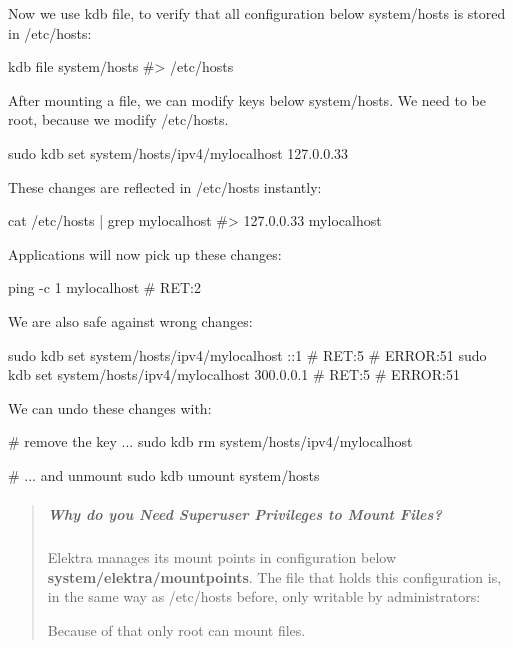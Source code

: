 Now we use {\ttfamily kdb file}, to verify that all configuration below {\ttfamily system/hosts} is stored in {\ttfamily /etc/hosts}\+:


\begin{DoxyCode}
kdb file system/hosts
#> /etc/hosts
\end{DoxyCode}


After mounting a file, we can modify keys below {\ttfamily system/hosts}. We need to be root, because we modify {\ttfamily /etc/hosts}.


\begin{DoxyCode}
sudo kdb set system/hosts/ipv4/mylocalhost 127.0.0.33
\end{DoxyCode}


These changes are reflected in {\ttfamily /etc/hosts} instantly\+:


\begin{DoxyCode}
cat /etc/hosts | grep mylocalhost
#> 127.0.0.33   mylocalhost
\end{DoxyCode}


Applications will now pick up these changes\+:


\begin{DoxyCode}
ping -c 1 mylocalhost
# RET:2
\end{DoxyCode}


We are also safe against wrong changes\+:


\begin{DoxyCode}
sudo kdb set system/hosts/ipv4/mylocalhost ::1
# RET:5
# ERROR:51
sudo kdb set system/hosts/ipv4/mylocalhost 300.0.0.1
# RET:5
# ERROR:51
\end{DoxyCode}


We can undo these changes with\+:


\begin{DoxyCode}
# remove the key ...
sudo kdb rm system/hosts/ipv4/mylocalhost

# ... and unmount
sudo kdb umount system/hosts
\end{DoxyCode}


\begin{quote}
\subparagraph*{Why do you Need Superuser Privileges to Mount Files?}



Elektra manages its mount points in configuration below {\bfseries system/elektra/mountpoints}. The file that holds this configuration is, in the same way as {\ttfamily /etc/hosts} before, only writable by administrators\+: 


Because of that only root can mount files. \end{quote}


